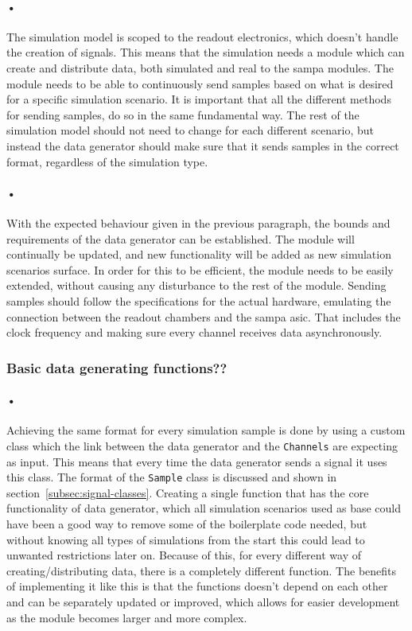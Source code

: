 \documentclass[a4paper, 12pt]{report}
\newcommand{\codeword}[1]{\texttt{#1}}
\begin{document}
\paragraph{•}
The simulation model is scoped to the readout electronics, which doesn't handle the creation of signals.
This means that the simulation needs a module which can create and distribute data, both simulated and real to the \gls{sampa} modules.
The module needs to be able to continuously send samples based on what is desired for a specific simulation scenario.
It is important that all the different methods for sending samples, do so in the same fundamental way.
The rest of the simulation model should not need to change for each different scenario, but instead the data generator should make sure that it sends samples in the correct format, regardless of the simulation type.

\paragraph{•}
With the expected behaviour given in the previous paragraph, the bounds and requirements of the data generator can be established.
The module will continually be updated, and new functionality will be added as new simulation scenarios surface. 
In order for this to be efficient, the module needs to be easily extended, without causing any disturbance to the rest of the module.
Sending samples should follow the specifications for the actual hardware, emulating the connection between the readout chambers and the \gls{sampa} asic.
That includes the clock frequency and making sure every channel receives data asynchronously.

\subsubsection{Basic data generating functions??}

\paragraph{•}
Achieving the same format for every simulation sample is done by using a custom class which the link between the data generator and the \codeword{Channels} are expecting as input.
This means that every time the data generator sends a signal it uses this class.
The format of the \codeword{Sample} class is discussed and shown in section~\ref{subsec:signal-classes}.
Creating a single function that has the core functionality of data generator, which all simulation scenarios used as base could have been a good way to remove some of the boilerplate code needed, but without knowing all types of simulations from the start this could lead to unwanted restrictions later on.
Because of this, for every different way of creating/distributing data, there is a completely different function.
The benefits of implementing it like this is that the functions doesn't depend on each other and can be separately updated or improved, which allows for easier development as the module becomes larger and more complex.
\end{document}
